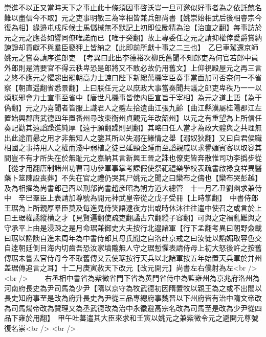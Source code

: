崇進不以正又當時天下之事止此十條須因事啓沃豈一旦可邀似好事者為之依託兢名難以盡信今不取】元之吏事明敏三為宰相皆兼兵部尚書【姚崇始相武后後相睿宗今復為相】緣邉屯戍斥候士馬儲械無不默記上初即位勵精為治【治直之翻】每事訪於元之元之應荅如響同僚唯諾而已【唯于癸翻】故上專委任之元之請抑權倖愛爵賞納諫諍却貢獻不與羣臣褻狎上皆納之【此即前所獻十事之二三也】　乙巳車駕還京師　姚元之嘗奏請序進郎吏　【考異曰此出李德裕次柳氏舊聞不知郎吏為何官若郎中員外郎則是清要官不得云秩卑恐是郎將又不敢必故仍用舊文】上仰視殿屋元之再三言之終不應元之懼趨出罷朝高力士諫曰陛下新總萬機宰臣奏事當面加可否奈何一不省察【朝直遥翻省悉景翻】上曰朕任元之以庶政大事當奏聞共議之郎吏卑秩乃一一以煩朕邪會力士宣事至省中【唐世凡機事皆使内臣宣旨于宰相】為元之道上語【為于偽翻】元之乃喜聞者皆服上識君人之體左拾遺曲江張九齡【曲江縣漢屬桂陽郡江左置始興郡唐武德四年置番州尋改東衡州貞觀元年改韶州】以元之有重望為上所信任奏記勸其遠謟躁進純厚【遠于願翻躁則到翻】其略曰任人當才為政大體與之共理無出此途而曏之用才非無知人之鑒其所以失溺在緣情之舉【溺奴狄翻】又曰自君侯職相國之事持用人之權而淺中弱植之徒已延頸企踵而至謟親戚以求譽媚賓客以取容其間豈不有才所失在於無耻元之嘉納其言新興王晉之誅也僚吏皆奔散惟司功李撝步從【從才用翻唐制諸州功曹司功參軍事掌考課假使祭祀禮樂學校表疏書啟禄食祥異醫藥卜筮陳設喪葬】不失在官之禮仍哭其尸姚元之聞之曰欒布之儔也【欒布哭彭越】及為相擢為尚書郎己酉以刑部尚書趙彦昭為朔方道大總管　十一月乙丑劉幽求兼侍中　辛巳羣臣上表請加尊號為開元神武皇帝從之戊子受冊【上時掌翻】　中書侍郎王琚為上所親厚羣臣莫及每進見侍笑語逮夜方出或時休沐往往遣中使召之或言於上曰王琚權譎縱横之才【見賢遍翻使疏吏翻譎古穴翻縱子容翻】可與之定禍亂難與之守承平上由是浸疎之是月命琚兼御史大夫按行北邉諸軍【行下孟翻考異曰朝野僉載曰琚以謟諛自進未周年為中書侍郎其母氏聞之自洛赴京戒之曰汝徒以謟媚取容色交自逹朝廷側目海内切齒吾恐汝家墳隴無人守之琚慙懼表請侍母上初大怒後許之按舊傳琚未嘗去官侍母今不取舊傳又云使琚按行天兵以北諸軍按五年始置天兵軍於并州盖琚傳追言之耳】十二月庚寅赦天下改元【改元開元】尚書左右僕射為左<br />
<br />
　　右丞相中書省為紫微省門下省為黄門省侍中為監雍州為京兆府洛州為河南府長史為尹司馬為少尹【隋以京守為牧武德初因隋置牧以親王為之或不出閤以長史知府事至是改為府升長史為尹從三品專總府事魏晉以下州府皆有治中隋文帝改為司馬煬帝改為贊理又為丞武德改為治中永徽避高宗名改為司馬至是改為少尹從四品下雍於用翻】　甲午吐蕃遣其大臣來求和壬寅以姚元之兼紫微令元之避開元尊號復名崇<br />
<br />
